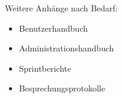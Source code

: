 \documentclass[
	papersize=A4,
	fontsize=12pt, 
	laterality=oneside, 
	draft=false,
	parskip=half,
	BCOR=0mm,
	linespread=1.15,
	language={english,ngerman},
	biblatex, %
	bibfile=99--references.bib,
	biblatexstyle=alphabetic,
	biblatexdashed=false,  %
	biblatexbackref=true,  %
	bibtexstyle=alpha, 
	dispositioncolor={30,103,182},
	colorlinks=true, %
    titlepage=titlepage,
	todonotesoptions={color=Dandelion,bordercolor=white},
	addcolophon=false, %
	addlistoftodos=false, %
]{longdoc}
\begin{document}










% 

\appendix


\LDinsertbibliography

\listoffigures

\listoftables









Weitere Anhänge nach Bedarf:

\begin{itemize}
\item Benutzerhandbuch
\item Administrationshandbuch
\item Sprintberichte
\item  Besprechungsprotokolle
\end{itemize}
\end{document}

